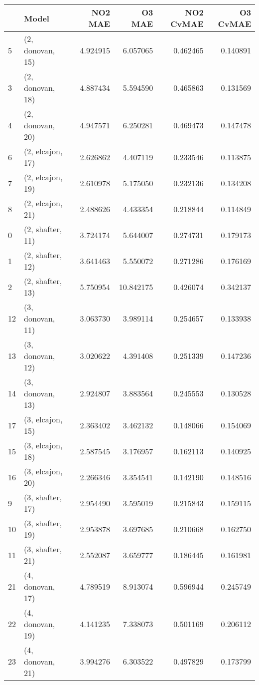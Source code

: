 \begin{tabular}{llrrrr}
\toprule
{} &             Model &    NO2 MAE &     O3 MAE &  NO2 CvMAE &  O3 CvMAE \\
\midrule
5  &  (2, donovan, 15) &   4.924915 &   6.057065 &   0.462465 &  0.140891 \\
3  &  (2, donovan, 18) &   4.887434 &   5.594590 &   0.465863 &  0.131569 \\
4  &  (2, donovan, 20) &   4.947571 &   6.250281 &   0.469473 &  0.147478 \\
6  &  (2, elcajon, 17) &   2.626862 &   4.407119 &   0.233546 &  0.113875 \\
7  &  (2, elcajon, 19) &   2.610978 &   5.175050 &   0.232136 &  0.134208 \\
8  &  (2, elcajon, 21) &   2.488626 &   4.433354 &   0.218844 &  0.114849 \\
0  &  (2, shafter, 11) &   3.724174 &   5.644007 &   0.274731 &  0.179173 \\
1  &  (2, shafter, 12) &   3.641463 &   5.550072 &   0.271286 &  0.176169 \\
2  &  (2, shafter, 13) &   5.750954 &  10.842175 &   0.426074 &  0.342137 \\
12 &  (3, donovan, 11) &   3.063730 &   3.989114 &   0.254657 &  0.133938 \\
13 &  (3, donovan, 12) &   3.020622 &   4.391408 &   0.251339 &  0.147236 \\
14 &  (3, donovan, 13) &   2.924807 &   3.883564 &   0.245553 &  0.130528 \\
17 &  (3, elcajon, 15) &   2.363402 &   3.462132 &   0.148066 &  0.154069 \\
15 &  (3, elcajon, 18) &   2.587545 &   3.176957 &   0.162113 &  0.140925 \\
16 &  (3, elcajon, 20) &   2.266346 &   3.354541 &   0.142190 &  0.148516 \\
9  &  (3, shafter, 17) &   2.954490 &   3.595019 &   0.215843 &  0.159115 \\
10 &  (3, shafter, 19) &   2.953878 &   3.697685 &   0.210668 &  0.162750 \\
11 &  (3, shafter, 21) &   2.552087 &   3.659777 &   0.186445 &  0.161981 \\
21 &  (4, donovan, 17) &   4.789519 &   8.913074 &   0.596944 &  0.245749 \\
22 &  (4, donovan, 19) &   4.141235 &   7.338073 &   0.501169 &  0.206112 \\
23 &  (4, donovan, 21) &   3.994276 &   6.303522 &   0.497829 &  0.173799 \\

\end{tabular}

